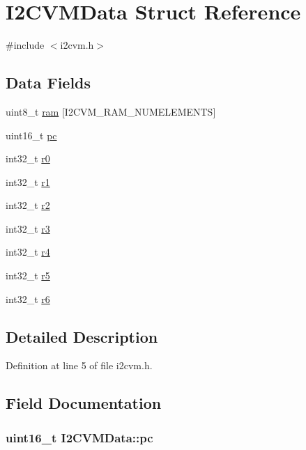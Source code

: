 \hypertarget{struct_i2_c_v_m_data}{\section{\-I2\-C\-V\-M\-Data \-Struct \-Reference}
\label{struct_i2_c_v_m_data}
}


{\ttfamily \#include $<$i2cvm.\-h$>$}

\subsection*{\-Data \-Fields}
\begin{DoxyCompactItemize}
\item 
uint8\-\_\-t \hyperlink{struct_i2_c_v_m_data_aa78a321c590d3f7b5d503b948813c509}{ram} \mbox{[}\-I2\-C\-V\-M\-\_\-\-R\-A\-M\-\_\-\-N\-U\-M\-E\-L\-E\-M\-E\-N\-T\-S\mbox{]}
\item 
uint16\-\_\-t \hyperlink{struct_i2_c_v_m_data_ab06e5a47a14e65556c2560ee7dce6e80}{pc}
\item 
int32\-\_\-t \hyperlink{struct_i2_c_v_m_data_a57f3e029983539b73d8e3003fdb6dc4a}{r0}
\item 
int32\-\_\-t \hyperlink{struct_i2_c_v_m_data_ae2818ce904b068618235b51a6c6d7e40}{r1}
\item 
int32\-\_\-t \hyperlink{struct_i2_c_v_m_data_abd3898745367cbba7a19f3c0a5f47afc}{r2}
\item 
int32\-\_\-t \hyperlink{struct_i2_c_v_m_data_a1d5b72045630c265b07c8e4e158bc9d6}{r3}
\item 
int32\-\_\-t \hyperlink{struct_i2_c_v_m_data_a53ddf0fdf36d0e77d4573e671c87839d}{r4}
\item 
int32\-\_\-t \hyperlink{struct_i2_c_v_m_data_a0cc4a4425c2f8d447a8629b6102db6d5}{r5}
\item 
int32\-\_\-t \hyperlink{struct_i2_c_v_m_data_a44579b97441bc54acb0deed60dff7a1f}{r6}
\end{DoxyCompactItemize}


\subsection{\-Detailed \-Description}


\-Definition at line 5 of file i2cvm.\-h.



\subsection{\-Field \-Documentation}
\hypertarget{struct_i2_c_v_m_data_ab06e5a47a14e65556c2560ee7dce6e80}{
\subsubsection[{pc}]{\setlength{\rightskip}{0pt plus 5cm}uint16\-\_\-t {\bf \-I2\-C\-V\-M\-Data\-::pc}}}\label{struct_i2_c_v_m_data_ab06e5a47a14e65556c2560ee7dce6e80}


